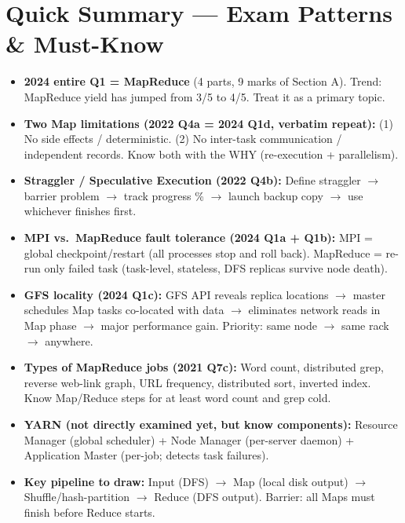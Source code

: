 \documentclass[12pt, a4paper]{article}
\newenvironment{notesbox}{\begin{mdframed}[style=notesframe]}{\end{mdframed}}
\begin{document}
\section{Quick Summary --- Exam Patterns \& Must-Know}
\begin{notesbox}
\begin{itemize}[leftmargin=1.3cm, itemsep=3pt]
  \item \textbf{2024 entire Q1 = MapReduce} (4 parts, 9 marks of Section A).
    Trend: MapReduce yield has jumped from 3/5 to 4/5. Treat it as a primary topic.

  \item \textbf{Two Map limitations (2022 Q4a = 2024 Q1d, verbatim repeat):}
    (1) No side effects / deterministic.
    (2) No inter-task communication / independent records.
    Know both with the WHY (re-execution + parallelism).

  \item \textbf{Straggler / Speculative Execution (2022 Q4b):}
    Define straggler $\rightarrow$ barrier problem $\rightarrow$ track progress \%
    $\rightarrow$ launch backup copy $\rightarrow$ use whichever finishes first.

  \item \textbf{MPI vs.\ MapReduce fault tolerance (2024 Q1a + Q1b):}
    MPI = global checkpoint/restart (all processes stop and roll back).
    MapReduce = re-run only failed task (task-level, stateless, DFS replicas survive node death).

  \item \textbf{GFS locality (2024 Q1c):}
    GFS API reveals replica locations $\rightarrow$ master schedules Map tasks co-located with data
    $\rightarrow$ eliminates network reads in Map phase $\rightarrow$ major performance gain.
    Priority: same node $\to$ same rack $\to$ anywhere.

  \item \textbf{Types of MapReduce jobs (2021 Q7c):}
    Word count, distributed grep, reverse web-link graph, URL frequency, distributed sort,
    inverted index. Know Map/Reduce steps for at least word count and grep cold.

  \item \textbf{YARN (not directly examined yet, but know components):}
    Resource Manager (global scheduler) + Node Manager (per-server daemon)
    + Application Master (per-job; detects task failures).

  \item \textbf{Key pipeline to draw:}
    Input (DFS) $\to$ Map (local disk output) $\to$ Shuffle/hash-partition
    $\to$ Reduce (DFS output). Barrier: all Maps must finish before Reduce starts.
\end{itemize}
\end{notesbox}
\end{document}
